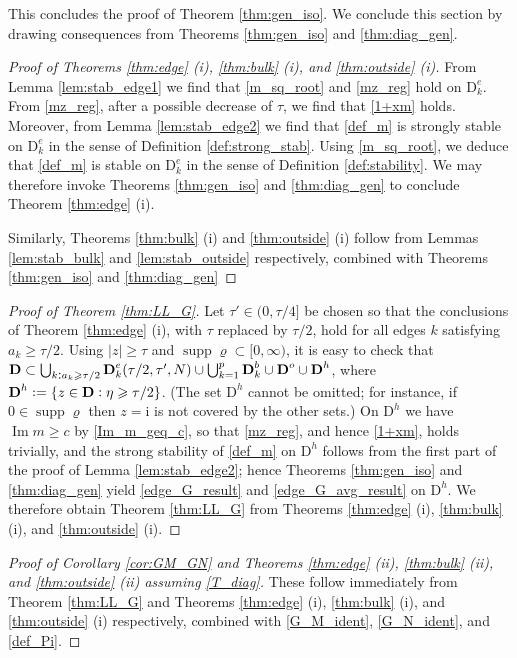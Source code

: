 \documentclass[11pt]{article} %
\numberwithin{equation}{section}
\numberwithin{figure}{section}
\theoremstyle{plain} %
\theoremstyle{definition} %
\newcommand{\f}[1]{\boldsymbol{\mathrm{#1}}} %
\newcommand{\ii}{\mathrm{i}}
\newcommand{\col}{\mathrel{\vcenter{\baselineskip0.75ex \lineskiplimit0pt \hbox{.}\hbox{.}}}}
\newcommand*{\deq}{\mathrel{\vcenter{\baselineskip0.65ex \lineskiplimit0pt \hbox{.}\hbox{.}}}=}
\renewcommand{\geq}{\geqslant}
\newcommand{\h}[1]{\{{#1}\}}
\newcommand{\abs}[1]{\lvert #1 \rvert}
\DeclareMathOperator{\supp}{supp}
\DeclareMathOperator{\im}{Im}
\begin{document}
This concludes the proof of Theorem \ref{thm:gen_iso}. We conclude this section by drawing consequences from Theorems \ref{thm:gen_iso} and \ref{thm:diag_gen}.

\begin{proof}[Proof of Theorems \ref{thm:edge} {\normalfont(i)}, \ref{thm:bulk} {\normalfont(i)}, and \ref{thm:outside} {\normalfont(i)}]
From Lemma \ref{lem:stab_edge1} we find that \eqref{m_sq_root} and \eqref{mz_reg} hold on $\f D^e_k$. From \eqref{mz_reg}, after a possible decrease of $\tau$, we find that \eqref{1+xm} holds. Moreover, from Lemma \ref{lem:stab_edge2} we find that \eqref{def_m} is strongly stable on $\f D^e_k$ in the sense of Definition \ref{def:strong_stab}. Using \eqref{m_sq_root}, we deduce that \eqref{def_m} is stable on $\f D^e_k$ in the sense of Definition \ref{def:stability}. We may therefore invoke Theorems \ref{thm:gen_iso} and \ref{thm:diag_gen} to conclude Theorem \ref{thm:edge} (i).

Similarly, Theorems \ref{thm:bulk} (i) and \ref{thm:outside} (i) follow from Lemmas \ref{lem:stab_bulk} and \ref{lem:stab_outside} respectively, combined with Theorems \ref{thm:gen_iso} and \ref{thm:diag_gen}
\end{proof}

\begin{proof}[Proof of Theorem \ref{thm:LL_G}]
Let $\tau' \in (0, \tau/4]$ be chosen so that the conclusions of Theorem \ref{thm:edge} (i), with $\tau$ replaced by $\tau/2$, hold for all edges $k$ satisfying $a_k \geq \tau/2$. Using $\abs{z} \geq \tau$ and $\supp \varrho \subset [0,\infty)$, it is easy to check that $\f D \subset \bigcup_{k \col a_k \geq \tau/2} \f D^e_k(\tau/2, \tau', N) \cup \bigcup_{k = 1}^p \f D^b_k \cup \f D^o \cup \f D^h$, where $\f D^h \deq \h{z \in \f D \col \eta \geq \tau/2}$. (The set $\f D^h$ cannot be omitted; for instance, if $0 \in \supp \varrho$ then $z = \ii$ is not covered by the other sets.) On $\f D^h$ we have $\im m \geq c$ by \eqref{Im_m_geq_c}, so that \eqref{mz_reg}, and hence \eqref{1+xm}, holds trivially, and the strong stability of \eqref{def_m} on $\f D^h$ follows from the first part of the proof of Lemma \ref{lem:stab_edge2}; hence Theorems \ref{thm:gen_iso} and \ref{thm:diag_gen} yield \eqref{edge_G_result} and \eqref{edge_G_avg_result} on $\f D^h$. We therefore obtain Theorem \ref{thm:LL_G} from Theorems \ref{thm:edge} (i), \ref{thm:bulk} (i), and \ref{thm:outside} (i).
\end{proof}

\begin{proof}[Proof of Corollary \ref{cor:GM_GN} and Theorems \ref{thm:edge} {\normalfont(ii)}, \ref{thm:bulk} {\normalfont(ii)}, and \ref{thm:outside} {\normalfont(ii)}  assuming \eqref{T_diag}]
These follow immediately from Theorem \ref{thm:LL_G} and Theorems \ref{thm:edge} (i), \ref{thm:bulk} (i), and \ref{thm:outside} (i) respectively, combined with \eqref{G_M_ident}, \eqref{G_N_ident}, and \eqref{def_Pi}.
\end{proof}
\end{document}
